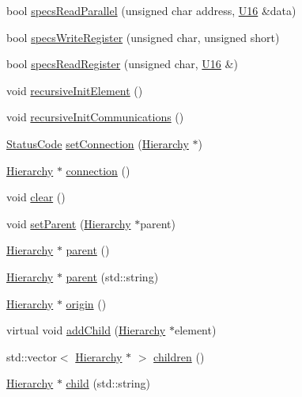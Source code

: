 \begin{DoxyCompactItemize}
bool \hyperlink{classSpecsInterface_aefbe6b92a9f9e2f00bf41dd8b2605c05}{specsReadParallel} (unsigned char address, \hyperlink{LSDelayChipV1_8h_adf928e51a60dba0df29d615401cc55a8}{U16} \&data)
\item 
bool \hyperlink{classSpecsInterface_ab70adfa5ad87097469c7485126a3c61a}{specsWriteRegister} (unsigned char, unsigned short)
\item 
bool \hyperlink{classSpecsInterface_a87080bb575d1b9d0bb313c48e7d3f59a}{specsReadRegister} (unsigned char, \hyperlink{LSDelayChipV1_8h_adf928e51a60dba0df29d615401cc55a8}{U16} \&)
\item 
void \hyperlink{classElement_a3c0abcb36f8906688bb7e32608df7086}{recursiveInitElement} ()
\item 
void \hyperlink{classElement_a82119ed37dff76508a2746a853ec35ba}{recursiveInitCommunications} ()
\item 
\hyperlink{classStatusCode}{StatusCode} \hyperlink{classElement_ab476b4b1df5954141ceb14f072433b89}{setConnection} (\hyperlink{classHierarchy}{Hierarchy} $\ast$)
\item 
\hyperlink{classHierarchy}{Hierarchy} $\ast$ \hyperlink{classElement_af57444353c1ddf9fa0109801e97debf7}{connection} ()
\item 
void \hyperlink{classHierarchy_af4d43b0765b402670eed2d62c73405af}{clear} ()
\item 
void \hyperlink{classHierarchy_a585ad1aeec16077a0e532ab8b4fc557b}{setParent} (\hyperlink{classHierarchy}{Hierarchy} $\ast$parent)
\item 
\hyperlink{classHierarchy}{Hierarchy} $\ast$ \hyperlink{classHierarchy_a1c7bec8257e717f9c1465e06ebf845fc}{parent} ()
\item 
\hyperlink{classHierarchy}{Hierarchy} $\ast$ \hyperlink{classHierarchy_ad550588733bf75ac5c0fcfd7c8fd11a6}{parent} (std::string)
\item 
\hyperlink{classHierarchy}{Hierarchy} $\ast$ \hyperlink{classHierarchy_aee461dc930ce3871636ff87f075b1b83}{origin} ()
\item 
virtual void \hyperlink{classHierarchy_ad677774ff38fcb257c04a3a10d471fac}{addChild} (\hyperlink{classHierarchy}{Hierarchy} $\ast$element)
\item 
std::vector$<$ \hyperlink{classHierarchy}{Hierarchy} $\ast$ $>$ \hyperlink{classHierarchy_aa9a76f69e98e052ee1a6e32cea006288}{children} ()
\item 
\hyperlink{classHierarchy}{Hierarchy} $\ast$ \hyperlink{classHierarchy_a1e207f973c694b538bf90107b4868817}{child} (std::string)
\item 

\end{DoxyCompactItemize}
